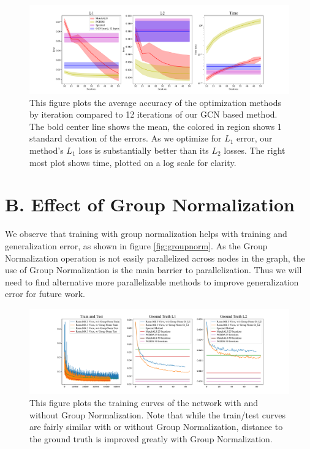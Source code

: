 \documentclass[10pt,twocolumn,letterpaper]{article}
\begin{document}
\begin{figure}[ht]
\begin{center}
  \includegraphics[width=0.9\linewidth]{figures/IterationsPlot.pdf}
\end{center}
  \caption{
    This figure plots the average accuracy of the optimization methods by iteration compared to 12 iterations of our GCN based method.
    The bold center line shows the mean, the colored in region shows 1 standard devation of the errors.
    As we optimize for $L_1$ error, our method's $L_1$ loss is substantially better than its $L_2$ losses.
    The right most plot shows time, plotted on a log scale for clarity.
  }
\label{fig:iterplot}
\label{fig:onecol}
\end{figure}

\section*{B. Effect of Group Normalization}
We observe that training with group normalization helps with training and generalization error, as shown in figure \ref{fig:groupnorm}.
As the Group Normalization operation is not easily parallelized across nodes in the graph, the use of Group Normalization is the main barrier to parallelization.
Thus we will need to find alternative more parallelizable methods to improve generalization error for future work.

\begin{figure}[ht]
\begin{center}
  \includegraphics[width=0.9\linewidth]{figures/GroupNormTest.pdf}
\end{center}
  \caption{
    This figure plots the training curves of the network with and without Group Normalization.
    Note that while the train/test curves are fairly similar with or without Group Normalization, distance to the ground truth is improved greatly with Group Normalization.
  }
\label{fig:groupnorm}
\label{fig:onecol}
\end{figure}
\end{document}
